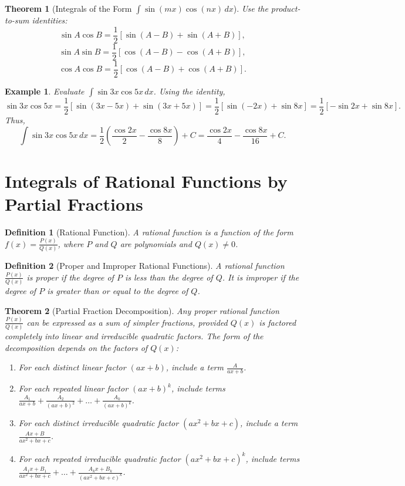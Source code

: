 \documentclass[11pt,a4paper]{article}
\newtheorem{example}{Example}
\newtheorem{theorem}{Theorem}
\newtheorem{definition}{Definition}
\begin{document}
\begin{theorem}[Integrals of the Form $\int \sin(mx) \cos(nx) \, dx$]
Use the product-to-sum identities:
\[
\sin A \cos B = \frac{1}{2} [\sin(A-B) + \sin(A+B)],
\]
\[
\sin A \sin B = \frac{1}{2} [\cos(A-B) - \cos(A+B)],
\]
\[
\cos A \cos B = \frac{1}{2} [\cos(A-B) + \cos(A+B)].
\]
\end{theorem}
\begin{example}
Evaluate $\displaystyle \int \sin 3x \cos 5x \, dx$.
Using the identity,
\[
\sin 3x \cos 5x = \frac{1}{2} [\sin(3x-5x) + \sin(3x+5x)] = \frac{1}{2} [\sin(-2x) + \sin 8x] = \frac{1}{2} [-\sin 2x + \sin 8x].
\]
Thus,
\[
\int \sin 3x \cos 5x \, dx = \frac{1}{2} \left( \frac{\cos 2x}{2} - \frac{\cos 8x}{8} \right) + C = \frac{\cos 2x}{4} - \frac{\cos 8x}{16} + C.
\]
\end{example}
\section{Integrals of Rational Functions by Partial Fractions}
\begin{definition}[Rational Function]
A \textit{rational function} is a function of the form $f(x) = \frac{P(x)}{Q(x)}$, where $P$ and $Q$ are polynomials and $Q(x) \neq 0$.
\end{definition}
\begin{definition}[Proper and Improper Rational Functions]
A rational function $\frac{P(x)}{Q(x)}$ is \textit{proper} if the degree of $P$ is less than the degree of $Q$. It is \textit{improper} if the degree of $P$ is greater than or equal to the degree of $Q$.
\end{definition}
\begin{theorem}[Partial Fraction Decomposition]
Any proper rational function $\frac{P(x)}{Q(x)}$ can be expressed as a sum of simpler fractions, provided $Q(x)$ is factored completely into linear and irreducible quadratic factors. The form of the decomposition depends on the factors of $Q(x)$:
\begin{enumerate}
\item For each distinct linear factor $(ax + b)$, include a term $\frac{A}{ax + b}$.
\item For each repeated linear factor $(ax + b)^k$, include terms $\frac{A_1}{ax + b} + \frac{A_2}{(ax + b)^2} + \dots + \frac{A_k}{(ax + b)^k}$.
\item For each distinct irreducible quadratic factor $(ax^2 + bx + c)$, include a term $\frac{Ax + B}{ax^2 + bx + c}$.
\item For each repeated irreducible quadratic factor $(ax^2 + bx + c)^k$, include terms $\frac{A_1 x + B_1}{ax^2 + bx + c} + \dots + \frac{A_k x + B_k}{(ax^2 + bx + c)^k}$.
\end{enumerate}
\end{theorem}
\end{document}
